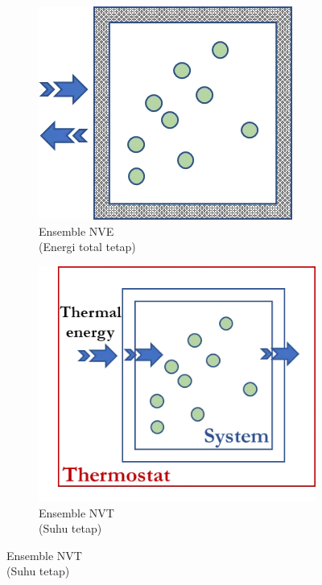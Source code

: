 \begin{figure}[htbp]
    \centering
    \begin{subfigure}[b]{0.45\textwidth}
        \centering
        \includegraphics[width=\textwidth]{gambar/NVE.png}
        \caption{Ensemble NVE \\ (Energi total tetap)}
        \label{fig:nve}
    \end{subfigure}
    
    \vspace{1em}  %
    
    \begin{subfigure}[b]{0.45\textwidth}
        \centering
        \includegraphics[width=\textwidth]{gambar/NVT.png}
        \caption{Ensemble NVT \\ (Suhu tetap)}
        \label{fig:nvt}
    \end{subfigure}
    

\end{figure}
